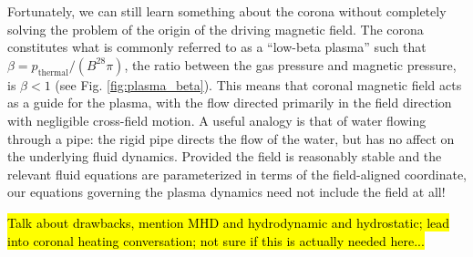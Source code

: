 %
\par Fortunately, we can still learn something about the corona without completely solving the problem of the origin of the driving magnetic field. The corona constitutes what is commonly referred to as a ``low-beta plasma'' such that $\beta=p_{\mathrm{thermal}}/(B^28\pi)$, the ratio between the gas pressure and magnetic pressure, is $\beta<1$ (see Fig. \ref{fig:plasma_beta}). This means that coronal magnetic field acts as a guide for the plasma, with the flow directed primarily in the field direction with negligible cross-field motion. A useful analogy is that of water flowing through a pipe: the rigid pipe directs the flow of the water, but has no affect on the underlying fluid dynamics. Provided the field is reasonably stable and the relevant fluid equations are parameterized in terms of the field-aligned coordinate, our equations governing the plasma dynamics need not include the field at all!
%
\par \hl{Talk about drawbacks, mention MHD and hydrodynamic and hydrostatic; lead into coronal heating conversation; not sure if this is actually needed here...}
